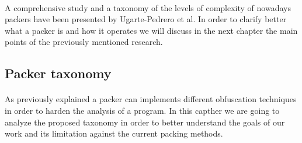 \paragraph{}
A comprehensive study and a taxonomy of the levels of complexity of nowadays packers have been presented by Ugarte-Pedrero et al\cite{sokpacker}. 
In order to clarify better what a packer is and how it operates we will discuss in the next chapter the main points of the previously mentioned research.

\subsection{Packer taxonomy}
\paragraph{}
As previously explained a packer can implements different obfuscation techniques in order to harden the analysis of a program. In this capther we are going to analyze the proposed taxonomy in order to better understand the goals of our work and its limitation against the current packing methods.

